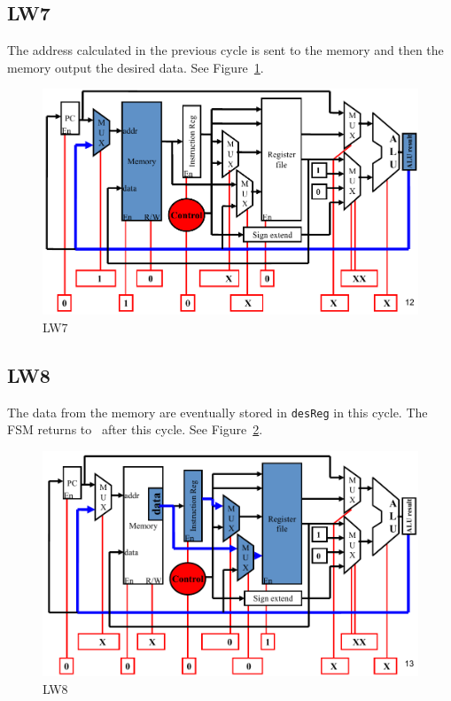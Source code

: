 \documentclass[a4paper]{article}
\begin{document}
\subsection{LW7}
The address calculated in the previous cycle is sent to the memory and then the memory output the desired data.
See Figure~\ref{fig:lw7}.
\begin{figure}[ht!]
    \center
    \includegraphics[scale=0.4]{lw7}
    \caption{LW7}\label{fig:lw7}
\end{figure}

\subsection{LW8}
The data from the memory are eventually stored in \verb|desReg| in this cycle. The FSM returns to~ after this cycle.
See Figure~\ref{fig:lw8}.
\begin{figure}[ht!]
    \center
    \includegraphics[scale=0.4]{lw8}
    \caption{LW8}\label{fig:lw8}
\end{figure}
\end{document}
